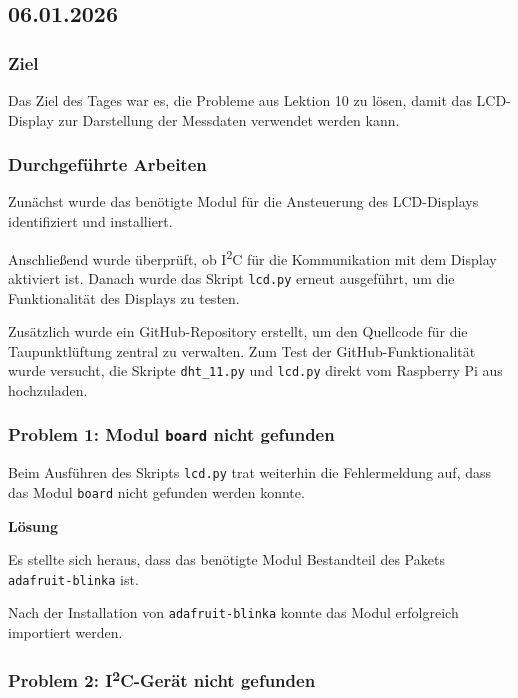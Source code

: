 \subsection{06.01.2026}

\subsubsection{Ziel}

Das Ziel des Tages war es, die Probleme aus Lektion 10 zu lösen,
damit das LCD-Display zur Darstellung der Messdaten verwendet werden kann.

\subsubsection{Durchgeführte Arbeiten}

Zunächst wurde das benötigte Modul für die Ansteuerung des
LCD-Displays identifiziert und installiert.

Anschließend wurde überprüft, ob I\textsuperscript{2}C für die
Kommunikation mit dem Display aktiviert ist. Danach wurde das Skript
\texttt{lcd.py} erneut ausgeführt, um die Funktionalität des
Displays zu testen.

Zusätzlich wurde ein GitHub-Repository erstellt, um den Quellcode
für die Taupunktlüftung zentral zu verwalten. Zum Test der
GitHub-Funktionalität wurde versucht, die Skripte
\texttt{dht\_11.py} und \texttt{lcd.py} direkt vom Raspberry Pi
aus hochzuladen.

\subsubsection{Problem 1: Modul \texttt{board} nicht gefunden}

Beim Ausführen des Skripts \texttt{lcd.py} trat weiterhin die
Fehlermeldung auf, dass das Modul \texttt{board} nicht gefunden
werden konnte.

\textbf{Lösung}

Es stellte sich heraus, dass das benötigte Modul Bestandteil des
Pakets \texttt{adafruit-blinka} ist.

Nach der Installation von \texttt{adafruit-blinka} konnte das Modul
erfolgreich importiert werden.

\subsubsection{Problem 2: I\textsuperscript{2}C-Gerät nicht gefunden}

